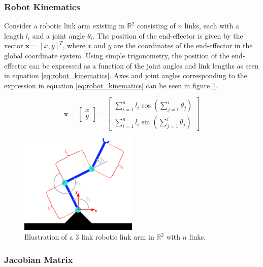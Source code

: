     \subsubsection{Robot Kinematics}
    \label{sec:robot_kinematics}
Consider a robotic link arm existing in $\mathbb{R}^2$ consisting of $n$ links, each with a length $l_i$ and a joint angle $\theta_i$. The position of the end-effector is given by the vector $\mathbf{x} = [x, y]^T$, where $x$ and $y$ are the coordinates of the end-effector in the global coordinate system. Using simple trigonometry, the position of the end-effector can be expressed as a function of the joint angles and link lengths as seen in equation \ref{eq:robot_kinematics}. 
Axes and joint angles corresponding to the expression in equation \ref{eq:robot_kinematics} can be seen in figure \ref{fig:robotic_link_arm}. 

\begin{equation}
    \label{eq:robot_kinematics}
    \mathbf{x} = \begin{bmatrix}
        x \\
        y
    \end{bmatrix} = \begin{bmatrix}
        \sum_{i=1}^{n} l_i \cos\left(\sum_{j=1}^{i} \theta_j\right) \\
        \sum_{i=1}^{n} l_i \sin\left(\sum_{j=1}^{i} \theta_j\right)
    \end{bmatrix}
\end{equation}

\begin{figure}[H]
    \centering
    \includegraphics[width=0.5\textwidth]{Images/manipulator_inkscape.png}
    \caption{Illustration of a 3 link robotic link arm in $\mathbb{R}^2$ with $n$ links.}
    \label{fig:robotic_link_arm}
\end{figure}


    \subsubsection{Jacobian Matrix}

